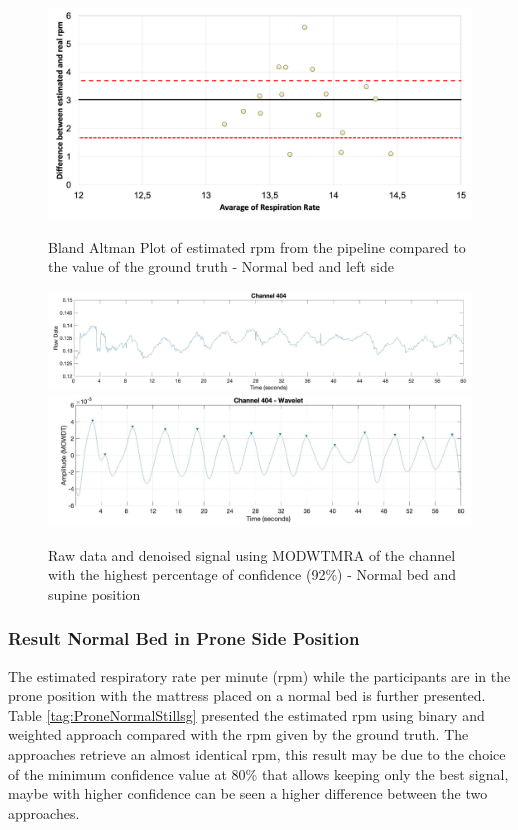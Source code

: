 \begin{figure}[p]
  \centering
  \includegraphics[width=\textwidth]{img/balnd2.png}

  \caption{Bland Altman Plot of estimated rpm from the pipeline compared to the value of the ground truth - Normal bed and left side}
  \label{fig:baln2}
  \vspace{1.5cm}
  \includegraphics[width=\textwidth]{img/404.jpg}
  \includegraphics[width=\textwidth]{img/404_wave.jpg}
\caption{Raw data and denoised signal using MODWTMRA of the channel with the highest percentage of confidence (92\%) - Normal bed and supine position}
  \label{fig:rec}
\end{figure}


\clearpage
\subsubsection{Result Normal Bed in Prone Side Position}   

The estimated respiratory rate per minute (rpm) while the participants are in the prone position with the mattress placed on a normal bed is further presented. Table \ref{tag:ProneNormalStillsg} presented the estimated rpm using binary and weighted approach compared with the rpm given by the ground truth. The approaches retrieve an almost identical rpm, this result may be due to the choice of the minimum confidence value at 80\% that allows keeping only the best signal, maybe with higher confidence can be seen a higher difference between the two approaches. 

